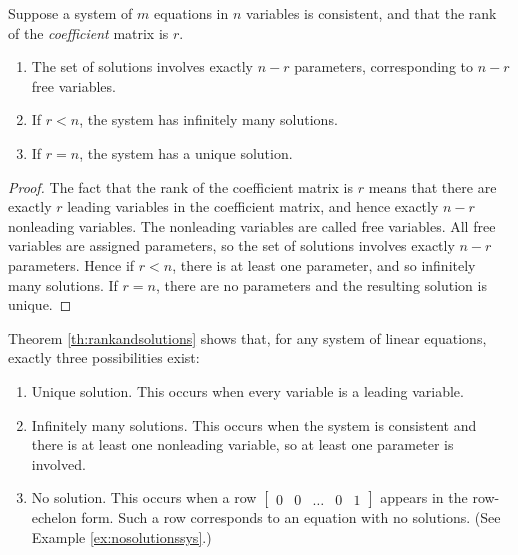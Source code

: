 \documentclass{ximera}
\begin{document}
\begin{theorem}\label{th:rankandsolutions}
Suppose a system of $m$ equations in $n$ variables is consistent, and that the rank of the {\it coefficient} matrix is $r$.

\begin{enumerate}
\item The set of solutions involves exactly $n - r$ parameters, corresponding to $n-r$ free variables.

\item If $r < n$, the system has infinitely many solutions.

\item If $r = n$, the system has a unique solution.

\end{enumerate}
\end{theorem}

\begin{proof}
The fact that the rank of the coefficient matrix is $r$ means that there are exactly $r$ leading variables in the coefficient matrix, and hence exactly $n - r$ nonleading variables. The nonleading variables are called free variables.  All free variables are assigned parameters, so the set of solutions involves exactly $n - r$ parameters. Hence if $r < n$, there is at least one parameter, and so infinitely many solutions. If $r = n$, there are no parameters and the resulting solution is unique.
\end{proof}

Theorem \ref{th:rankandsolutions} shows that, for any system of linear equations, exactly three possibilities exist:

\begin{enumerate}

\item Unique solution. This occurs when every variable is a leading variable.

\item Infinitely many solutions. This occurs when the system is consistent and there is at least one nonleading variable, so at least one parameter is involved.

\item No solution.  This occurs when a row $\left[\begin{array}{cccc|c}  0&0&\ldots &0&1
 \end{array}\right]$ appears in the row-echelon form. Such a row corresponds to an equation with no solutions. (See Example \ref{ex:nosolutionssys}.)

\end{enumerate}
\end{document}
